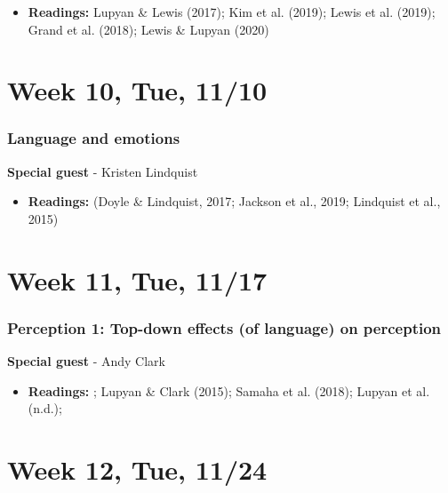 \documentclass[11pt,man]{article}
\providecommand{\tightlist}{%
  \setlength{\itemsep}{0pt}\setlength{\parskip}{0pt}}
\begin{document}
\begin{itemize}
\tightlist
\item
  \textbf{Readings:} Lupyan \& Lewis (2017); Kim et al. (2019); Lewis et
  al. (2019); Grand et al. (2018); Lewis \& Lupyan (2020)
\end{itemize}

\hypertarget{week-10-tue-1110}{%
\section{Week 10, Tue, 11/10}\label{week-10-tue-1110}}

\hypertarget{language-and-emotions}{%
\subsubsection{Language and emotions}\label{language-and-emotions}}

\textbf{Special guest} - Kristen Lindquist

\begin{itemize}
\tightlist
\item
  \textbf{Readings:} (Doyle \& Lindquist, 2017; Jackson et al., 2019;
  Lindquist et al., 2015)
\end{itemize}

\hypertarget{week-11-tue-1117}{%
\section{Week 11, Tue, 11/17}\label{week-11-tue-1117}}

\hypertarget{perception-1-top-down-effects-of-language-on-perception}{%
\subsubsection{Perception 1: Top-down effects (of language) on
perception}\label{perception-1-top-down-effects-of-language-on-perception}}

\textbf{Special guest} - Andy Clark

\begin{itemize}
\tightlist
\item
  \textbf{Readings:} ; Lupyan \& Clark (2015); Samaha et al. (2018);
  Lupyan et al. (n.d.);
\end{itemize}

\hypertarget{week-12-tue-1124}{%
\section{Week 12, Tue, 11/24}\label{week-12-tue-1124}}
\end{document}
